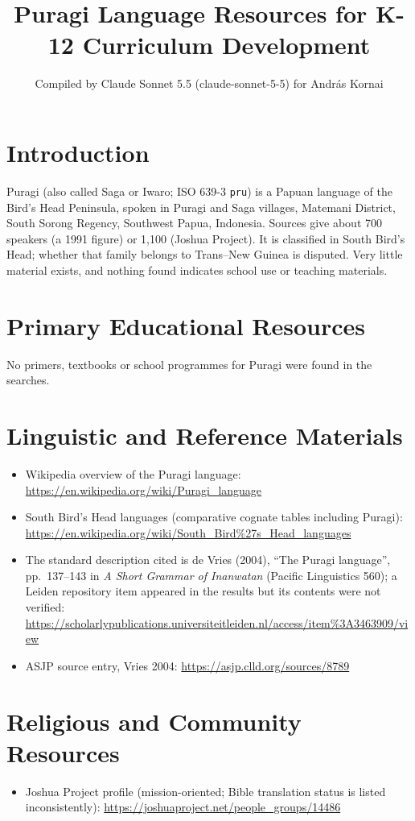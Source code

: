 \documentclass[12pt]{article}
\title{Puragi Language Resources for K-12 Curriculum Development}
\author{Compiled by Claude Sonnet 5.5 (claude-sonnet-5-5) for Andr\'as Kornai}
\date{}
\begin{document}
\maketitle

\section{Introduction}
Puragi (also called Saga or Iwaro; ISO 639-3 \texttt{pru}) is a Papuan language of the Bird's Head Peninsula, spoken in Puragi and Saga villages, Matemani District, South Sorong Regency, Southwest Papua, Indonesia. Sources give about 700 speakers (a 1991 figure) or 1,100 (Joshua Project). It is classified in South Bird's Head; whether that family belongs to Trans--New Guinea is disputed. Very little material exists, and nothing found indicates school use or teaching materials.

\section{Primary Educational Resources}
No primers, textbooks or school programmes for Puragi were found in the searches.

\section{Linguistic and Reference Materials}
\begin{itemize}
\item Wikipedia overview of the Puragi language: \url{https://en.wikipedia.org/wiki/Puragi_language}
\item South Bird's Head languages (comparative cognate tables including Puragi): \url{https://en.wikipedia.org/wiki/South_Bird%27s_Head_languages}
\item The standard description cited is de Vries (2004), ``The Puragi language'', pp.\ 137--143 in \emph{A Short Grammar of Inanwatan} (Pacific Linguistics 560); a Leiden repository item appeared in the results but its contents were not verified: \url{https://scholarlypublications.universiteitleiden.nl/access/item%3A3463909/view}
\item ASJP source entry, Vries 2004: \url{https://asjp.clld.org/sources/8789}
\end{itemize}

\section{Religious and Community Resources}
\begin{itemize}
\item Joshua Project profile (mission-oriented; Bible translation status is listed inconsistently): \url{https://joshuaproject.net/people_groups/14486}
\end{itemize}
\end{document}
